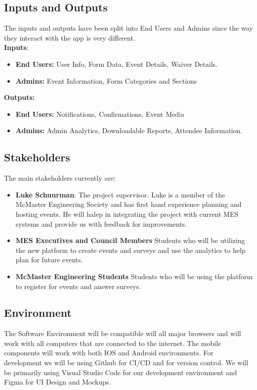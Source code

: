 \documentclass{article}
\begin{document}
\subsection{Inputs and Outputs}
The inputs and outputs have been split into End Users and Admins since the way they interact with the app is very different.\\
\textbf{Inputs}:
\begin{itemize}
    \item \textbf{End Users:} 
        User Info, Form Data, Event Details, Waiver Details.
    \item \textbf{Admins:} Event Information, Form Categories and Sections
\end{itemize} 
\textbf{Outputs:} 
\begin{itemize}
    \item \textbf{End Users:} Notifications, Confirmations, Event Media
    \item \textbf{Admins:} Admin Analytics, Downloadable Reports, Attendee Information.
\end{itemize}

\subsection{Stakeholders}
The main stakeholders currently are:
\begin{itemize}
    \item \textbf{Luke Schuurman}: The project supervisor.\newline
        Luke is a member of the McMaster Engineering Society and has first hand experience planning and hosting events. He will halep in integrating the project with current MES systems and provide us with feedback for improvements. 
    \item \textbf{MES Executives and Council Members}\newline
        Students who will be utilizing the new platform to create events and surveys and use the analytics to help plan for future events.
    \item \textbf{McMaster Engineering Students} \newline
        Students who will be using the platform to register for events and answer surveys.
\end{itemize}
\subsection{Environment}
The Software Environment will be compatible will all major browsers and will work with all computers that are connected to the internet. The mobile components will work with both IOS and Android environments. For development we will be using Github for CI/CD and for version control. We will be primarily using Visual Studio Code for our development environment and Figma for UI Design and Mockups.
\end{document}
